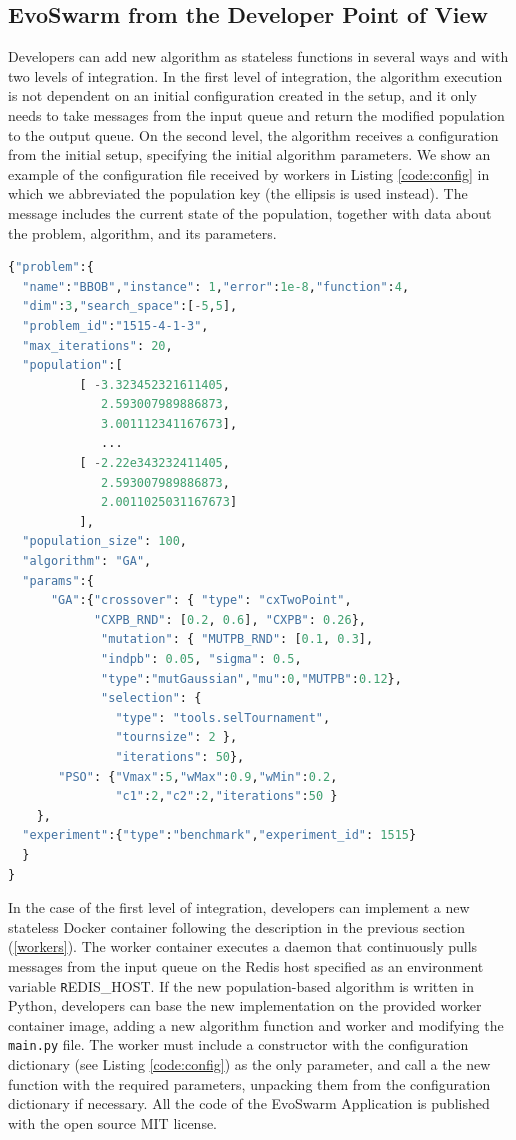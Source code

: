 \documentclass[review]{elsarticle}
\begin{document}
\subsection{EvoSwarm from the Developer Point of View} 

Developers can add new algorithm as stateless functions in
several ways and with two levels of integration. In the first level of
integration, the algorithm execution is not dependent on an initial
configuration created in the setup, and it only needs to take messages from the
input queue and return the modified population to the output queue. On the
second level, the algorithm receives a configuration from the initial setup,
specifying the initial algorithm parameters. We show an example of the configuration
file received by workers in Listing \ref{code:config}  in which we abbreviated
the population key (the ellipsis is used instead). The message includes the current state
of the population, together with data about the problem, algorithm,
and its parameters. 

\begin{lstlisting}[language=Python, caption = Configuration message example, label=code:config]
{"problem":{
  "name":"BBOB","instance": 1,"error":1e-8,"function":4,
  "dim":3,"search_space":[-5,5],
  "problem_id":"1515-4-1-3",
  "max_iterations": 20,
  "population":[
          [ -3.323452321611405, 
             2.593007989886873, 
             3.001112341167673],
             ...
          [ -2.22e343232411405, 
             2.593007989886873, 
             2.0011025031167673] 
          ],
  "population_size": 100,
  "algorithm": "GA",  
  "params":{
      "GA":{"crossover": { "type": "cxTwoPoint", 
            "CXPB_RND": [0.2, 0.6], "CXPB": 0.26},
             "mutation": { "MUTPB_RND": [0.1, 0.3], 
             "indpb": 0.05, "sigma": 0.5, 
             "type":"mutGaussian","mu":0,"MUTPB":0.12},
             "selection": { 
               "type": "tools.selTournament", 
               "tournsize": 2 },
               "iterations": 50},
       "PSO": {"Vmax":5,"wMax":0.9,"wMin":0.2,
               "c1":2,"c2":2,"iterations":50 } 
    },
  "experiment":{"type":"benchmark","experiment_id": 1515}
  }
}
\end{lstlisting}

In the case of the first level of integration, developers
can implement a new stateless Docker container following
the description in the previous section (\ref{workers}). The worker
container executes a daemon that continuously pulls messages from the input queue
on the Redis host specified as an environment variable {\texttt REDIS\_HOST}. If the new
population-based algorithm is written in Python, developers can base the new
implementation on the provided worker container image, adding a new algorithm
function and worker and modifying the \texttt{main.py} file. 
The worker must include a constructor with the configuration dictionary 
(see Listing \ref{code:config}) as the only parameter, and call a the new function 
with the required parameters, unpacking them from the configuration dictionary if necessary.
All the code of the EvoSwarm Application is published with the open source MIT license.
\end{document}
